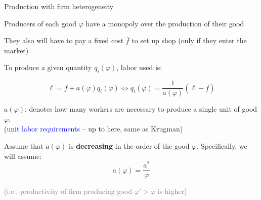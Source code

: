 \documentclass[notes,11pt, aspectratio=169, xcolor=table]{beamer}
\newcommand{\blue}[1]{\textcolor{blue}{#1}}
\newenvironment{wideitemize}{\itemize\addtolength{\itemsep}{10pt}}{\enditemize}
\begin{document}
\begin{frame}{Production with firm heterogeneity}

\begin{wideitemize}
    \item Producers of each good $\varphi$ have a monopoly over the production of their good
    \item They also will have to pay a fixed cost $\bar{f}$ to set up shop (only if they enter the market)

    \item To produce a given quantity $q_i(\varphi)$, labor used is:

    \begin{equation*}
         \ell = \bar{f} + a(\varphi)q_i(\varphi) \iff q_i(\varphi) = \frac{1}{a(\varphi)} (\ell - \bar{f})
    \end{equation*}

    \item $a(\varphi)$: denotes how many workers are necessary to produce a single unit of good $\varphi$. \\
    \qquad (\blue{unit labor requirements} -- up to here, same as Krugman) 

    \item<2-> Assume that $a(\varphi)$ is \textbf{decreasing} in the order of the good $\varphi$. Specifically, we will assume:
    \begin{equation*}
        a(\varphi) = \frac{a^*}{\varphi}
    \end{equation*}

    \textcolor{gray}{(i.e., productivity of firm producing good $\varphi'>\varphi$ is higher)}

\end{wideitemize}
    
\end{frame}
\end{document}
